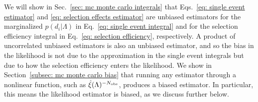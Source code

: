 We will show in Sec.~\ref{sec: mc monte carlo integrals} that Eqs.~\ref{eq: single event estimator} and \ref{eq: selection effects estimator} are unbiased estimators for the marginalized $p(d_i|\Lambda)$ in Eq.~\ref{eq: single event integral} and for the selection efficiency integral in Eq.~\ref{eq: selection efficiency}, respectively. A product of uncorrelated unbiased estimators is also an unbiased estimator, and so the bias in the likelihood is not due to the approximation in the single event integrals but due to how the selection efficiency enters the likelihood.
We show in Section~\ref{subsec: mc monte carlo bias} that running any estimator through a nonlinear function, such as $\hat{\xi}(\Lambda)^{-N_{\rm obs}}$, produces a biased estimator. In particular, this means the likelihood estimator is biased, as we discuss further below. 



%     

